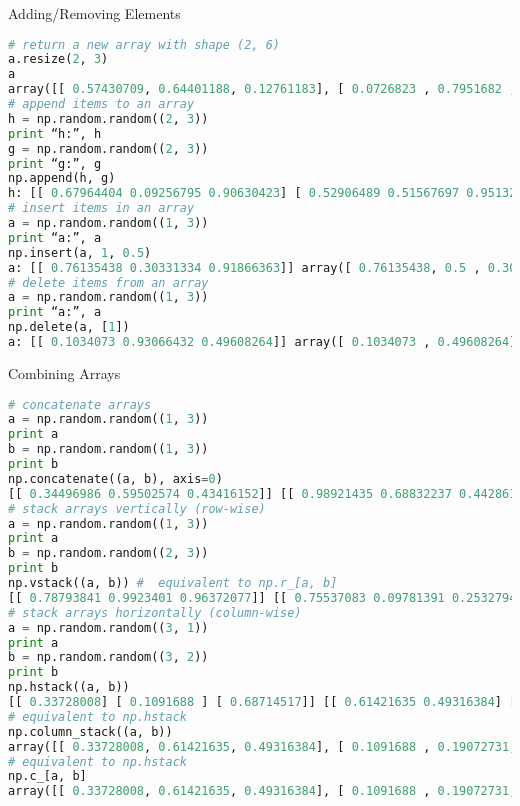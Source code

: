 Adding/Removing Elements

\begin{lstlisting}[language=Python]
# return a new array with shape (2, 6)
a.resize(2, 3)
a
array([[ 0.57430709, 0.64401188, 0.12761183], [ 0.0726823 , 0.7951682 , 0.54114093]])
# append items to an array
h = np.random.random((2, 3))
print “h:”, h
g = np.random.random((2, 3))
print “g:”, g
np.append(h, g)
h: [[ 0.67964404 0.09256795 0.90630423] [ 0.52906489 0.51567697 0.95132012]] g: [[ 0.03126344 0.84908154 0.74228134] [ 0.40333143 0.28595213 0.68416838]] array([ 0.67964404, 0.09256795, 0.90630423, 0.52906489, 0.51567697, 0.95132012, 0.03126344, 0.84908154, 0.74228134, 0.40333143, 0.28595213, 0.68416838])
# insert items in an array
a = np.random.random((1, 3))
print “a:”, a
np.insert(a, 1, 0.5)
a: [[ 0.76135438 0.30331334 0.91866363]] array([ 0.76135438, 0.5 , 0.30331334, 0.91866363])
# delete items from an array
a = np.random.random((1, 3))
print “a:”, a
np.delete(a, [1])
a: [[ 0.1034073 0.93066432 0.49608264]] array([ 0.1034073 , 0.49608264])
\end{lstlisting}

Combining Arrays

\begin{lstlisting}[language=Python]
# concatenate arrays
a = np.random.random((1, 3))
print a
b = np.random.random((1, 3))
print b
np.concatenate((a, b), axis=0)
[[ 0.34496986 0.59502574 0.43416152]] [[ 0.98921435 0.68832237 0.44286195]] array([[ 0.34496986, 0.59502574, 0.43416152], [ 0.98921435, 0.68832237, 0.44286195]])
# stack arrays vertically (row-wise)
a = np.random.random((1, 3))
print a
b = np.random.random((2, 3))
print b
np.vstack((a, b)) #  equivalent to np.r_[a, b]
[[ 0.78793841 0.9923401 0.96372077]] [[ 0.75537083 0.09781391 0.25327948] [ 0.20607759 0.03763863 0.30818643]] array([[ 0.78793841, 0.9923401 , 0.96372077], [ 0.75537083, 0.09781391, 0.25327948], [ 0.20607759, 0.03763863, 0.30818643]])
# stack arrays horizontally (column-wise)
a = np.random.random((3, 1))
print a
b = np.random.random((3, 2))
print b
np.hstack((a, b))
[[ 0.33728008] [ 0.1091688 ] [ 0.68714517]] [[ 0.61421635 0.49316384] [ 0.19072731 0.04383904] [ 0.30587218 0.28743208]] array([[ 0.33728008, 0.61421635, 0.49316384], [ 0.1091688 , 0.19072731, 0.04383904], [ 0.68714517, 0.30587218, 0.28743208]])
# equivalent to np.hstack
np.column_stack((a, b))
array([[ 0.33728008, 0.61421635, 0.49316384], [ 0.1091688 , 0.19072731, 0.04383904], [ 0.68714517, 0.30587218, 0.28743208]])
# equivalent to np.hstack
np.c_[a, b]
array([[ 0.33728008, 0.61421635, 0.49316384], [ 0.1091688 , 0.19072731, 0.04383904], [ 0.68714517, 0.30587218, 0.28743208]])
\end{lstlisting}

